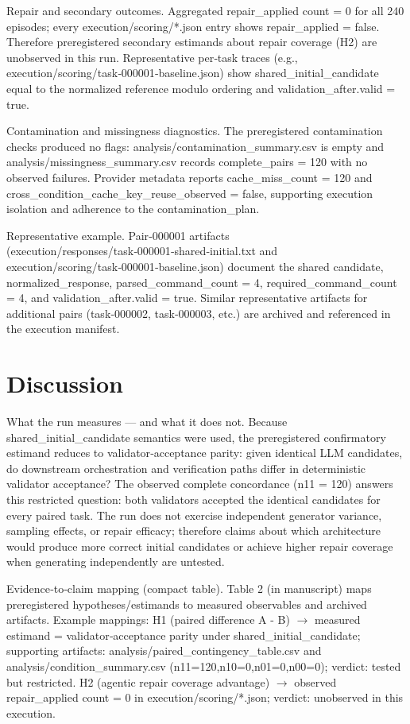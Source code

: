 \documentclass[conference]{IEEEtran}
\begin{document}
Repair and secondary outcomes. Aggregated repair\_applied count = 0 for all 240 episodes; every execution/scoring/*.json entry shows repair\_applied = false. Therefore preregistered secondary estimands about repair coverage (H2) are unobserved in this run. Representative per‑task traces (e.g., execution/scoring/task‑000001‑baseline.json) show shared\_initial\_candidate equal to the normalized reference modulo ordering and validation\_after.valid = true.

Contamination and missingness diagnostics. The preregistered contamination checks produced no flags: analysis/contamination\_summary.csv is empty and analysis/missingness\_summary.csv records complete\_pairs = 120 with no observed failures. Provider metadata reports cache\_miss\_count = 120 and cross\_condition\_cache\_key\_reuse\_observed = false, supporting execution isolation and adherence to the contamination\_plan.

Representative example. Pair‑000001 artifacts (execution/responses/task‑000001‑shared‑initial.txt and execution/scoring/task‑000001‑baseline.json) document the shared candidate, normalized\_response, parsed\_command\_count = 4, required\_command\_count = 4, and validation\_after.valid = true. Similar representative artifacts for additional pairs (task‑000002, task‑000003, etc.) are archived and referenced in the execution manifest.

\section{Discussion}
What the run measures --- and what it does not. Because shared\_initial\_candidate semantics were used, the preregistered confirmatory estimand reduces to validator‑acceptance parity: given identical LLM candidates, do downstream orchestration and verification paths differ in deterministic validator acceptance? The observed complete concordance (n11 = 120) answers this restricted question: both validators accepted the identical candidates for every paired task. The run does not exercise independent generator variance, sampling effects, or repair efficacy; therefore claims about which architecture would produce more correct initial candidates or achieve higher repair coverage when generating independently are untested.

Evidence‑to‑claim mapping (compact table). Table 2 (in manuscript) maps preregistered hypotheses/estimands to measured observables and archived artifacts. Example mappings: H1 (paired difference A - B) \ensuremath{\rightarrow} measured estimand = validator‑acceptance parity under shared\_initial\_candidate; supporting artifacts: analysis/paired\_contingency\_table.csv and analysis/condition\_summary.csv (n11=120,n10=0,n01=0,n00=0); verdict: tested but restricted. H2 (agentic repair coverage advantage) \ensuremath{\rightarrow} observed repair\_applied count = 0 in execution/scoring/*.json; verdict: unobserved in this execution.
\end{document}
